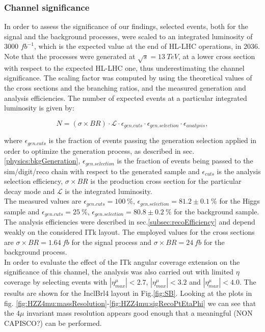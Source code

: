\documentclass[a4paper,twoside,12pt]{article}
\begin{document}
\subsubsection*{Channel significance}
In order to assess the significance of our findings, selected events, both for the signal and the background processes, were
scaled to an integrated luminosity of 3000 $fb^{-1}$, which is the expected
value at the end of HL-LHC operations, in 2036. \\

Note that the processes
were generated at $\sqrt{s} = 13\ TeV$, at a lower cross section with respect
to the expected HL-LHC one, thus underestimating the channel significance. The scaling factor was
computed by using the theoretical values of the cross sections and the branching ratios,
and the measured generation and analysis efficiencies. The number of expected
events at a particular integrated luminosity is given by: 

\begin{equation*}
N = (\sigma \times BR)\cdot \mathcal{L}\cdot \epsilon_{gen. cuts}\cdot \epsilon_{gen. selection} \cdot \epsilon_{analysis},
\end{equation*}

where $\epsilon_{gen. cuts}$ is the fraction of events passing the generation selection applied in order to optimize the generation process, as described in sec.\ref{physics:bkgGeneration}, 
$\epsilon_{gen. selection}$ is the fraction of events being passed to the sim/digit/reco chain with respect to the generated sample and $\epsilon_{cuts}$ is the 
analysis selection efficiency, $\sigma \times BR$ is the production cross section for the particular decay mode and $\mathcal{L}$ is the integrated luminosity. \\

The measured values are $\epsilon_{gen. cuts} = 100\ \%$, $\epsilon_{gen. selection} = 81.2 \pm 0.1\ \%$ for the Higgs sample and 
$\epsilon_{gen. cuts} = 25\ \%$, $\epsilon_{gen. selection} = 80.8 \pm 0.2\ \%$ for
the background sample. The analysis efficiencies were described in sec.\ref{subsec:recoEfficiency} and depend weakly on the considered ITk layout. The employed values for the cross sections are
$\sigma \times BR = 1.64\ fb$ for the signal process and $\sigma \times BR = 24\ fb$ for the background process.\\

In order to evaluate the effect of the ITk angular coverage extension on the significance of this channel, the analysis was also carried out with limited $\eta$ coverage by selecting 
events with $|\eta^\mu_{max}| < 2.7$, $|\eta^\mu_{max}| < 3.2$ and $|\eta^\mu_{max}| < 4.0$. The results are shown for the InclBrl4 layout in Fig.\ref{fig:SB}. Looking at the plots in
fig. \ref{fig:HZZ4mu:massResolution}-\ref{fig:HZZ4mu:sigRecoPtEtaPhi} we can see that the $4\mu$ invariant mass resolution appears good enough that a meaningful (NON CAPISCO?) can be performed. \\
\end{document}
